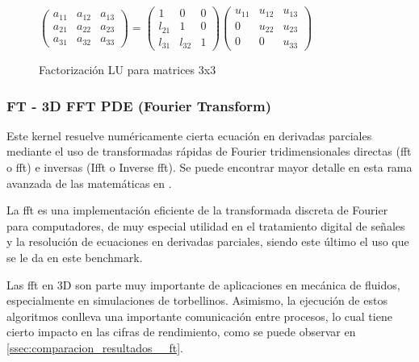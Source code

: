 \begin{figure}[h!]
  \vspace*{0.5cm}
  \centering
  
    $\begin{pmatrix}
    a_{11} & a_{12} & a_{13}\\
    a_{21} & a_{22} & a_{23}\\
    a_{31} & a_{32} & a_{33}
    \end{pmatrix}
    =
    \begin{pmatrix}
    1      & 0      & 0\\
    l_{21} & 1      & 0\\
    l_{31} & l_{32} & 1
    \end{pmatrix}
    \begin{pmatrix}
    u_{11} & u_{12} & u_{13}\\
    0      & u_{22} & u_{23}\\
    0      & 0      & u_{33}
    \end{pmatrix}
    $

  \caption{Factorización LU para matrices 3x3}
  \label{fig:factorizacion_lu}
\end{figure}

\subsubsection{FT - 3D FFT PDE (Fourier Transform)}
Este kernel resuelve numéricamente cierta ecuación en derivadas parciales mediante el uso de transformadas rápidas de Fourier tridimensionales directas (\acrshort{fft} o \acrlong{fft}) e inversas (I\acrshort{fft} o Inverse \acrshort{fft}). Se puede encontrar mayor detalle en esta rama avanzada de las matemáticas en \cite[2.2.4]{benchmarks1994technical}.

La \acrshort{fft} es una implementación eficiente de la transformada discreta de Fourier para computadores, de muy especial utilidad en el tratamiento digital de señales y la resolución de ecuaciones en derivadas parciales, siendo este último el uso que se le da en este benchmark. 

Las \acrshort{fft} en 3D son parte muy importante de aplicaciones en mecánica de fluidos, especialmente en simulaciones de torbellinos. Asimismo, la ejecución de estos algoritmos conlleva una importante comunicación entre procesos, lo cual tiene cierto impacto en las cifras de rendimiento, como se puede observar en \ref{ssec:comparacion_resultados__ft}.

